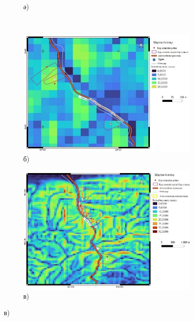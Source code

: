 \begin{figure}[H]
\begin{subfigure}[t]{0.42\textwidth}
        \caption*{ә)}
    \end{subfigure}
    \\
    \begin{subfigure}[t]{0.42\textwidth}
        \centering
        \includegraphics[width=\textwidth]{media/ict2/image221}
        \caption*{б)}
    \end{subfigure}
    \begin{subfigure}[t]{0.42\textwidth}
        \centering
        \includegraphics[width=\textwidth]{media/ict2/image222}
        \caption*{в)}
    \end{subfigure}
\end{figure}
